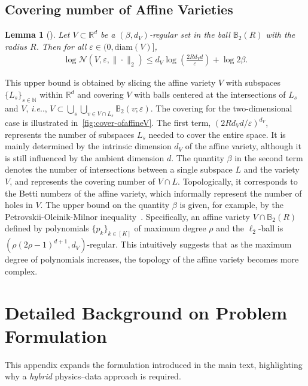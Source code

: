 \documentclass{article}
\makeatletter
\def\@onedot{\ifx\@let@token.\else.\null\fi\xspace}
\DeclareRobustCommand\onedot{\futurelet\@let@token\@onedot}
\def\ie{\emph{i.e}\onedot}
\theoremstyle{plain}
\newtheorem{lemma}[theorem]{Lemma}
\theoremstyle{definition}
\theoremstyle{remark}
\makeatother
\begin{document}
\subsection{Covering number of Affine Varieties}
\begin{lemma}[\citet{zhang2023covering}]
\label{lem:cov}
Let \( V \subset \mathbb{R}^d \) be a \((\beta, d_V)\)-regular set in the ball \( \mathbb{B}_2(R) \) with the radius \( R \). Then for all \( \varepsilon \in (0, \text{diam}(V)] \),
\begin{gather}
\label{eq:lem:cov}
\log \mathcal{N}(V, \varepsilon, \|\cdot \|_2) \leq d_V \log \left(\frac{2Rd_V d}{\varepsilon}\right) + \log 2\beta.
\end{gather}
\end{lemma}
This upper bound is obtained by slicing the affine variety \( V \) with subspaces \( \{ L_{s} \}_{s \in \mathbb{N}} \) within \( \mathbb{R}^d \) and covering \( V \) with balls centered at the intersections of \( L_s \) and \( V \), \ie, \( V \subset \bigcup_{s} \bigcup_{v \in V \cap L_s} \mathbb{B}_2(v; \varepsilon) \). The covering for the two-dimensional case is illustrated in~\cref{fig:cover-ofaffineV}. The first term, \( \left(2Rd_V d/\varepsilon\right)^{d_V} \), represents the number of subspaces \( L_s \) needed to cover the entire space. It is mainly determined by the intrinsic dimension \( d_V \) of the affine variety, although it is still influenced by the ambient dimension \( d \). The quantity \( \beta \) in the second term denotes the number of intersections between a single subspace \( L \) and the variety \( V \), and represents the covering number of \( V \cap L \). Topologically, it corresponds to the Betti numbers of the affine variety, which informally represent the number of holes in \(V\). The upper bound on the quantity \( \beta \) is given, for example, by the Petrovskii-Oleinik-Milnor inequality~\citep{Petrovskii1949,oleinik1951estimates,milnor1964betti}. Specifically, an affine variety \( V \cap \mathbb{B}_2(R) \) defined by polynomials \( \{ p_k \}_{k\in [K]} \) of maximum degree \( \rho \) and the \(\ell_2\)-ball is \((\rho(2\rho-1)^{d+1}, d_V)\)-regular. This intuitively suggests that as the maximum degree of polynomials increases, the topology of the affine variety becomes more complex.

\section{Detailed Background on Problem Formulation}
\label{app:detail_background}
This appendix expands the formulation introduced in the main text, highlighting why a \emph{hybrid} physics–data approach is required.
\end{document}
